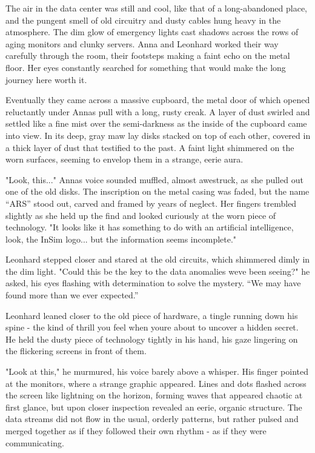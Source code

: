 \documentclass[
]{article}
\begin{document}
The air in the data center was still and cool, like that of a
long-abandoned place, and the pungent smell of old circuitry and dusty
cables hung heavy in the atmosphere. The dim glow of emergency lights
cast shadows across the rows of aging monitors and clunky servers. Anna
and Leonhard worked their way carefully through the room, their
footsteps making a faint echo on the metal floor. Her eyes constantly
searched for something that would make the long journey here worth it.

Eventually they came across a massive cupboard, the metal door of which
opened reluctantly under Anna\textquotesingle s pull with a long, rusty
creak. A layer of dust swirled and settled like a fine mist over the
semi-darkness as the inside of the cupboard came into view. In its deep,
gray maw lay disks stacked on top of each other, covered in a thick
layer of dust that testified to the past. A faint light shimmered on the
worn surfaces, seeming to envelop them in a strange, eerie aura.

"Look, this..." Anna\textquotesingle s voice sounded muffled, almost
awestruck, as she pulled out one of the old disks. The inscription on
the metal casing was faded, but the name ``ARS'' stood out, carved and
framed by years of neglect. Her fingers trembled slightly as she held up
the find and looked curiously at the worn piece of technology. "It looks
like it has something to do with an artificial intelligence, look, the
InSim logo... but the information seems incomplete."

Leonhard stepped closer and stared at the old circuits, which shimmered
dimly in the dim light. "Could this be the key to the data anomalies
we\textquotesingle ve been seeing?" he asked, his eyes flashing with
determination to solve the mystery. ``We may have found more than we
ever expected.''

Leonhard leaned closer to the old piece of hardware, a tingle running
down his spine - the kind of thrill you feel when you\textquotesingle re
about to uncover a hidden secret. He held the dusty piece of technology
tightly in his hand, his gaze lingering on the flickering screens in
front of them.

"Look at this," he murmured, his voice barely above a whisper. His
finger pointed at the monitors, where a strange graphic appeared. Lines
and dots flashed across the screen like lightning on the horizon,
forming waves that appeared chaotic at first glance, but upon closer
inspection revealed an eerie, organic structure. The data streams did
not flow in the usual, orderly patterns, but rather pulsed and merged
together as if they followed their own rhythm - as if they were
communicating.
\end{document}

